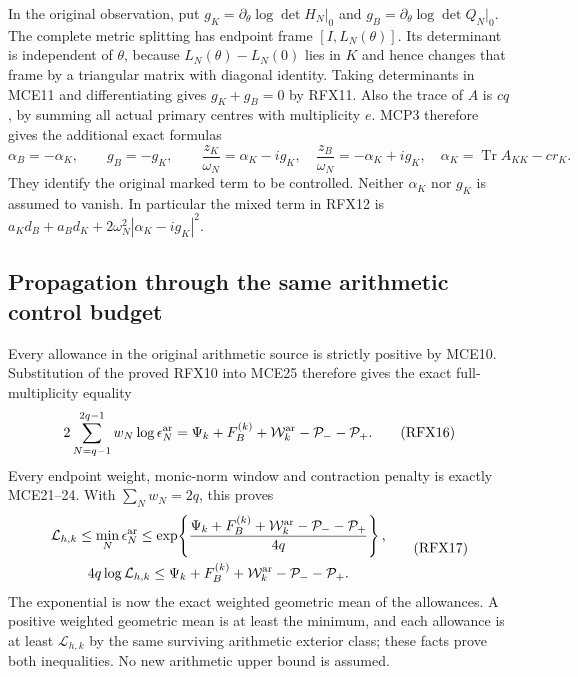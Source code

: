 \documentclass[11pt,a4paper]{article}
\begin{document}
In the original observation, put
$g_K=\partial_\theta\log\det H_N|_0$ and
$g_B=\partial_\theta\log\det Q_N|_0$. The complete metric splitting
has endpoint frame $[I,L_N(\theta)]$. Its determinant is independent
of $\theta$, because $L_N(\theta)-L_N(0)$ lies in $K$ and hence
changes that frame by a triangular matrix with diagonal identity.
Taking determinants in MCE11 and differentiating gives
$g_K+g_B=0$ by RFX11. Also the trace of $A$ is $cq$, by summing
all actual primary centres with multiplicity $e$. MCP3 therefore
gives the additional exact formulas
\[
 \alpha_B=-\alpha_K,\qquad g_B=-g_K,\qquad
 \frac{z_K}{\omega_N}=\alpha_K-ig_K,
 \quad\frac{z_B}{\omega_N}=-\alpha_K+ig_K,
 \quad\alpha_K=\operatorname{Tr}A_{KK}-cr_K.
 \tag{RFX15}
\]
They identify the original marked term to be controlled. Neither
$\alpha_K$ nor $g_K$ is assumed to vanish. In particular the mixed
term in RFX12 is
$a_Kd_B+a_Bd_K+2\omega_N^2|\alpha_K-ig_K|^2$.

\subsection{Propagation through the same arithmetic control budget}
Every allowance in the original arithmetic source is strictly
positive by MCE10. Substitution of the proved RFX10 into MCE25
therefore gives the exact full-multiplicity equality
\[
 2\sum_{N=q-1}^{2q-1}w_N\log\epsilon_N^{\rm ar}
 =\Psi_k+F_B^{(k)}+\mathcal W_k^{\rm ar}
                          -\mathcal P_--\mathcal P_+.
 \tag{RFX16}
\]
Every endpoint weight, monic-norm window and contraction penalty
is exactly MCE21--24. With $\sum_Nw_N=2q$, this proves
\[
 \begin{gathered}
 \mathcal L_{h,k}\le\min_N\epsilon_N^{\rm ar}
 \le\exp\!\left\{
 \frac{\Psi_k+F_B^{(k)}+\mathcal W_k^{\rm ar}
                   -\mathcal P_--\mathcal P_+}{4q}\right\},\\
 4q\log\mathcal L_{h,k}\le
 \Psi_k+F_B^{(k)}+\mathcal W_k^{\rm ar}-\mathcal P_--\mathcal P_+.
 \end{gathered}
 \tag{RFX17}
\]
The exponential is now the exact weighted geometric mean of the
allowances. A positive weighted geometric mean is at least the
minimum, and each allowance is at least $\mathcal L_{h,k}$ by the
same surviving arithmetic exterior class; these facts prove both
inequalities. No new arithmetic upper bound is assumed.
\end{document}
